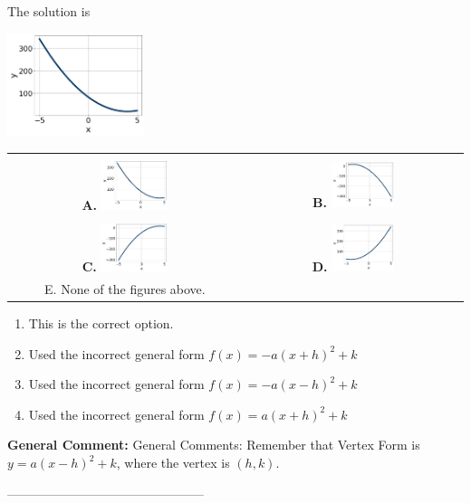 \documentclass{extbook}[14pt]
\begin{document}
 
 The solution is  
 \begin{center} \includegraphics[width=0.3\textwidth]{../Figures/quadraticEquationToGraphAC.png} \end{center}\begin{tabular}{|c|c|} 
\hline 
 & \tabularnewline 
 \textbf{A.} \includegraphics[width=0.3\textwidth]{../Figures/quadraticEquationToGraphAC.png} & \textbf{B.} \includegraphics[width=0.3\textwidth]{../Figures/quadraticEquationToGraphBC.png} \tabularnewline 
\hline 
 & \tabularnewline 
 \textbf{C.} \includegraphics[width=0.3\textwidth]{../Figures/quadraticEquationToGraphCC.png} & \textbf{D.} \includegraphics[width=0.3\textwidth]{../Figures/quadraticEquationToGraphDC.png} \tabularnewline 
\hline 
 E. None of the figures above. & \tabularnewline 
\hline 
 \end{tabular} 
 
\begin{enumerate}[label=\Alph*.] 
\item This is the correct option.  
\item Used the incorrect general form $f(x) = -a(x+h)^2 + k$  
\item Used the incorrect general form $f(x) = -a(x-h)^2 + k$  
\item Used the incorrect general form $f(x) = a(x+h)^2 + k$  
\end{enumerate} 
 
\textbf{General Comment:} General Comments: Remember that Vertex Form is $y = a(x-h)^2+k$, where the vertex is $(h, k)$. 

-----------------------------------------------
\end{document}
